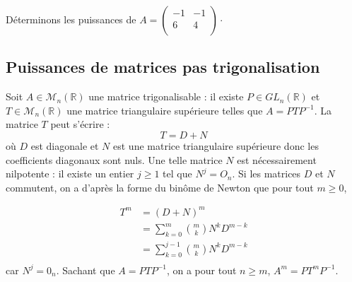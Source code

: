 \documentclass[a4paper,10pt]{report}
\begin{document}
\begin{ex} Déterminons les puissances de  $A = \begin{pmatrix}
-1 & -1  \\
 6   &  4 \\
\end{pmatrix} \cdot$

%

\vspace{13cm}
\end{ex}

\subsection{Puissances de matrices pas trigonalisation}
\noindent Soit $A \in \mathcal{M}_n(\mathbb{R})$ une matrice trigonalisable : il existe $P \in GL_n(\mathbb{R})$ et $T \in \mathcal{M}_n(\mathbb{R})$ une matrice triangulaire supérieure telles que $A=PTP^{-1}$. La matrice $T$ peut s'écrire :
$$ T = D+ N$$
où $D$ est diagonale et $N$ est une matrice triangulaire supérieure donc les coefficients diagonaux sont nuls. Une telle matrice $N$ est nécessairement nilpotente : il existe un entier $j \geq 1$ tel que $N^j=O_n$. Si les matrices $D$ et $N$ commutent, on a d'après la forme du binôme de Newton que pour tout $m \geq 0$,

\newpage

\begin{align*}
T^m & = (D+N)^m \\
& = \sum_{k=0}^m \binom{m}{k} N^k D^{m-k} \\
& = \sum_{k=0}^{j-1}\binom{m}{k} N^k D^{m-k} \\ 
\end{align*}
car $N^j=0_n$. Sachant que $A=PTP^{-1}$, on a pour tout $n \geq m$, $A^m=PT^mP^{-1}$.
\end{document}
